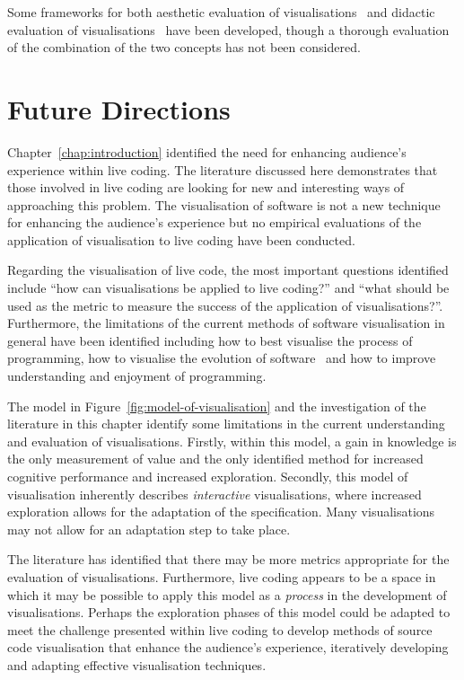 Some frameworks for both aesthetic evaluation of visualisations~\cite{Cawthon2007,Purchase1996} and didactic evaluation of visualisations~\cite{VanWijk2005} have been developed, though a thorough evaluation of the combination of the two concepts has not been considered.

\section{Future Directions}

Chapter~\ref{chap:introduction} identified the need for enhancing audience's experience within live coding. The literature discussed here demonstrates that those involved in live coding are looking for new and interesting ways of approaching this problem. The visualisation of software is not a new technique for enhancing the audience's experience but no empirical evaluations of the application of visualisation to live coding have been conducted.

Regarding the visualisation of live code, the most important questions identified include ``how can visualisations be applied to live coding?'' and ``what should be used as the metric to measure the success of the application of visualisations?''. Furthermore, the limitations of the current methods of software visualisation in general have been identified including how to best visualise the process of programming, how to visualise the evolution of software~\cite{Gall1999} and how to improve understanding and enjoyment of programming.

The model in Figure~\ref{fig:model-of-visualisation} and the investigation of the literature in this chapter identify some limitations in the current understanding and evaluation of visualisations. Firstly, within this model, a gain in knowledge is the only measurement of value and the only identified method for increased cognitive performance and increased exploration. Secondly, this model of visualisation inherently describes \textit{interactive} visualisations, where increased exploration allows for the adaptation of the specification. Many visualisations may not allow for an adaptation step to take place. 

The literature has identified that there may be more metrics appropriate for the evaluation of visualisations. Furthermore, live coding appears to be a space in which it may be possible to apply this model as a \textit{process} in the development of visualisations. Perhaps the exploration phases of this model could be adapted to meet the challenge presented within live coding to develop methods of source code visualisation that enhance the audience's experience, iteratively developing and adapting effective visualisation techniques.

